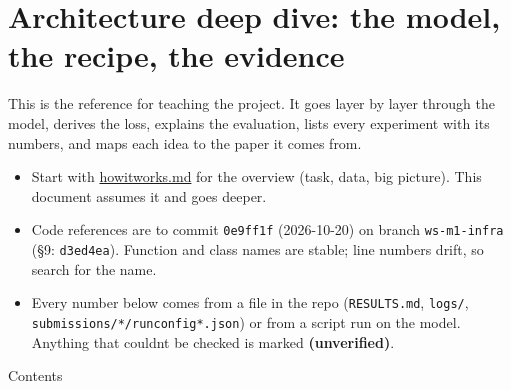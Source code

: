 \documentclass[
  11pt,
]{article}
\author{}
\date{}
\providecommand{\tightlist}{%
  \setlength{\itemsep}{0pt}\setlength{\parskip}{0pt}}
\renewcommand{\_}{\oldunderscore\allowbreak}
\begin{document}
{
\setcounter{tocdepth}{3}
\tableofcontents
}
\section{Architecture deep dive: the
model, the recipe, the
evidence}\label{architecture-deep-dive-the-model-the-recipe-the-evidence}

This is the reference for teaching the
project. It goes layer by layer through
the model, derives the loss, explains
the evaluation, lists every experiment
with its numbers, and maps each idea to
the paper it comes from.

\begin{itemize}
\tightlist
\item
  Start with
  \href{how_it_works.pdf}{how\_it\_works.md}
  for the overview (task, data, big
  picture). This document assumes it and
  goes deeper.
\item
  Code references are to commit
  \texttt{0e9ff1f} (2026-10-20) on
  branch \texttt{ws-m1-infra} (§9:
  \texttt{d3ed4ea}). Function and class
  names are stable; line numbers drift,
  so search for the name.
\item
  Every number below comes from a file
  in the repo (\texttt{RESULTS.md},
  \texttt{logs/},
  \texttt{submissions/*/run\_config*.json})
  or from a script run on the model.
  Anything that couldn\textquotesingle t
  be checked is marked
  \textbf{(unverified)}.
\end{itemize}

Contents
\end{document}

